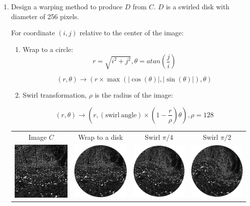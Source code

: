 \documentclass[12pt,a4paper,notitlepage,oneside,amsmath,amssymb]{article}
\begin{document}
\begin{CJK*}{UTF8}{bkai}
\begin{enumerate}[label=(\alph*)]
		\item Design a warping method to produce \(D\) from \(C\). \(D\) is a swirled disk with diameter of 256 pixels.

    For coordinate \((i,j)\) relative to the center of the image:
    \begin{enumerate}
      \item Wrap to a circle:
      \[r = \sqrt{i^2 + j^2}, \theta = atan (\frac{j}{i})\]

      \[(r,\theta ) \rightarrow (r \times \max (|\cos(\theta)|, |\sin(\theta)|), \theta)\]

      \item Swirl transformation, \(\rho\) is the radius of the image:

      \[(r,\theta ) \rightarrow (r , (\mathrm{swirl\ angle}) \times (1-\frac{r}{\rho}) \theta), \rho = 128\]
    \end{enumerate}

		      \begin{tabular}[h!]{cccc}
			      Image \(C\)                                           & Wrap to a disk & Swirl \( \pi/4 \) & Swirl \( \pi/2 \) \\
			      \includegraphics[width=.23\linewidth]{image_C}        &
			      \includegraphics[width=.23\linewidth]{image_D_round}  &
			      \includegraphics[width=.23\linewidth]{image_D_0_25PI} &
			      \includegraphics[width=.23\linewidth]{image_D_0_5PI}                                                           \\
		      \end{tabular}

	\end{enumerate}

	\clearpage

\end{CJK*}
\end{document}
